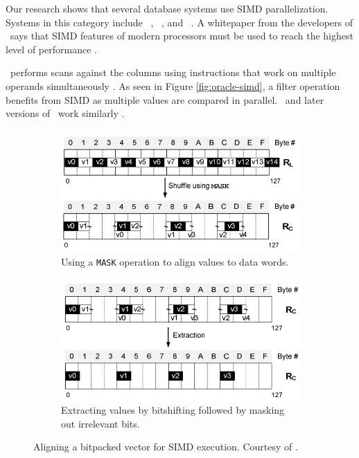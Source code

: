 Our research shows that several database systems use SIMD parallelization. Systems in this category include \oracle~\cite{Lahiri2015-mz}, \blink~\cite{Barber2012-xt}, and \ibm~\cite{Raman2013-em}. A whitepaper from the developers of \exasol~says that SIMD features of modern processors must be used to reach the highest level of performance \cite{Exasol2014-xh}.

\oracle~performs scans against the columns using instructions that work on multiple operands simultaneously \cite{Lahiri2015-mz}. As seen in Figure \ref{fig:oracle-simd}, a filter operation benefits from SIMD as multiple values are compared in parallel. \ibm~and later versions of \blink~work similarly \cite{Barber2012-xt, Raman2013-em}.

\begin{figure}
  \centering
  \begin{subfigure}{0.45\textwidth}
    \includegraphics[width=\textwidth]{img/simd-align-1.png}
    \caption{Using a \texttt{MASK} operation to align values to data words.}
    \label{fig:simd-align-1} 
  \end{subfigure}
  \begin{subfigure}{0.45\textwidth}
    \includegraphics[width=\textwidth]{img/simd-align-2.png}
    \caption{Extracting values by bitshifting followed by masking out irrelevant bits.}
    \label{fig:simd-align-2} 
  \end{subfigure}
  \caption{Aligning a bitpacked vector for SIMD execution. Courtesy of \cite{Willhalm2009-hu}.}
  \label{fig:simd-align} 
\end{figure}

